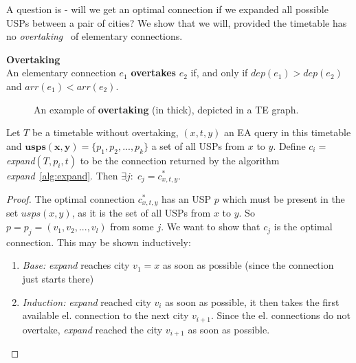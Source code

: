 	\noindent A question is - will we get an optimal connection if we expanded all possible USPs between a pair of cities? We show that we will, provided the timetable has no \textit{overtaking}~\cite{tdroute09} of elementary connections.
	
	\begin{definition}
        \textbf{Overtaking} \\
		An elementary connection $e_{1}$ \textbf{overtakes} $e_{2}$ if, and only if $dep(e_{1}) > dep(e_{2})$ and $arr(e_{1}) < arr(e_{2})$. 
    \end{definition}
    
    \begin{figure}[h!]
		\begin{center}
		\end{center}
		\caption{\label{fig:overtake} An example of \textcolor{green!80!black}{\textbf{overtaking}} (in thick), depicted in a TE graph.}
	\end{figure}
    
    \begin{lemma}
    	\label{lemma:expandusp}
    	Let $T$ be a timetable without overtaking, $(x, t, y)$ an EA query in this timetable and $\bm{usps(x, y)} = \{p_{1}, p_{2}, ..., p_{k}\}$ a set of all USPs from $x$ to $y$. Define $c_{i} = $\textit{expand}$(T, p_{i}, t)$ to be the connection returned by the algorithm \textit{expand}~\ref{alg:expand}. Then $\exists j:\; c_{j} = c_{x, t, y}^{*}$.
    \end{lemma}
    \begin{proof}
    	The optimal connection $c_{x, t, y}^{*}$ has an USP $p$ which must be present in the set $usps(x, y)$, as it is the set of all USPs from $x$ to $y$. So $p = p_{j} = (v_{1}, v_{2},..., v_{l})$ from some $j$. We want to show that $c_{j}$ is the optimal connection. This may be shown inductively:
    	\begin{enumerate}
    		\item \textit{Base:} \textit{expand} reaches city $v_{1} = x$ as soon as possible (since the connection just starts there)
    		\item \textit{Induction:} \textit{expand} reached city $v_{i}$ as soon as possible, it then takes the first available el. connection to the next city $v_{i + 1}$. Since the el. connections do not overtake, \textit{expand} reached the city $v_{i + 1}$ as soon as possible.
    	\end{enumerate}
    \end{proof}
    
